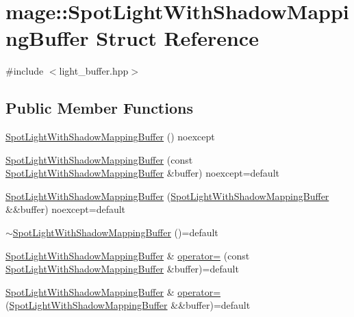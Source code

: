 \hypertarget{structmage_1_1_spot_light_with_shadow_mapping_buffer}{}\section{mage\+:\+:Spot\+Light\+With\+Shadow\+Mapping\+Buffer Struct Reference}
\label{structmage_1_1_spot_light_with_shadow_mapping_buffer}


{\ttfamily \#include $<$light\+\_\+buffer.\+hpp$>$}

\subsection*{Public Member Functions}
\begin{DoxyCompactItemize}
\item 
\hyperlink{structmage_1_1_spot_light_with_shadow_mapping_buffer_a2733e7c1041dd80bd6024197d6ec8910}{Spot\+Light\+With\+Shadow\+Mapping\+Buffer} () noexcept
\item 
\hyperlink{structmage_1_1_spot_light_with_shadow_mapping_buffer_a5618fa00a4496fd0a9bdef88ccccec5c}{Spot\+Light\+With\+Shadow\+Mapping\+Buffer} (const \hyperlink{structmage_1_1_spot_light_with_shadow_mapping_buffer}{Spot\+Light\+With\+Shadow\+Mapping\+Buffer} \&buffer) noexcept=default
\item 
\hyperlink{structmage_1_1_spot_light_with_shadow_mapping_buffer_aa9afdb5259f897a7e9ac9fc513ef5fc1}{Spot\+Light\+With\+Shadow\+Mapping\+Buffer} (\hyperlink{structmage_1_1_spot_light_with_shadow_mapping_buffer}{Spot\+Light\+With\+Shadow\+Mapping\+Buffer} \&\&buffer) noexcept=default
\item 
\hyperlink{structmage_1_1_spot_light_with_shadow_mapping_buffer_ae96fbec68878382084dce0147da2eb72}{$\sim$\+Spot\+Light\+With\+Shadow\+Mapping\+Buffer} ()=default
\item 
\hyperlink{structmage_1_1_spot_light_with_shadow_mapping_buffer}{Spot\+Light\+With\+Shadow\+Mapping\+Buffer} \& \hyperlink{structmage_1_1_spot_light_with_shadow_mapping_buffer_ad22e5a39ca0f4f313de923876c02b2ac}{operator=} (const \hyperlink{structmage_1_1_spot_light_with_shadow_mapping_buffer}{Spot\+Light\+With\+Shadow\+Mapping\+Buffer} \&buffer)=default
\item 
\hyperlink{structmage_1_1_spot_light_with_shadow_mapping_buffer}{Spot\+Light\+With\+Shadow\+Mapping\+Buffer} \& \hyperlink{structmage_1_1_spot_light_with_shadow_mapping_buffer_abb7324a9b98123e701b1e61cc7720cf9}{operator=} (\hyperlink{structmage_1_1_spot_light_with_shadow_mapping_buffer}{Spot\+Light\+With\+Shadow\+Mapping\+Buffer} \&\&buffer)=default
\end{DoxyCompactItemize}
